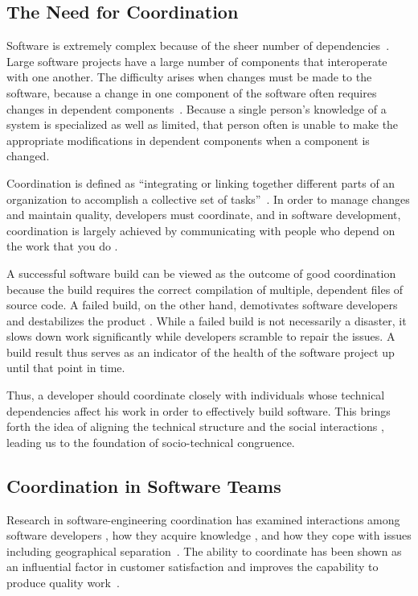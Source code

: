 \subsection{The Need for Coordination}
Software is extremely complex because of the sheer number of dependencies~\cite{sawyer2004:teams}.
Large software projects have a large number of components that interoperate with one another.
The difficulty arises when changes must be made to the software, because a change in one component of the software often requires changes in dependent components~\cite{desouza:2008}. Because a single person's knowledge of a system is specialized as well as limited, that person often is unable to make the appropriate modifications in dependent components when a component is changed.

Coordination is defined as ``integrating or linking together different parts of an organization to accomplish a collective set of tasks''~\cite{vandeven1976}. In order to manage changes and maintain quality, developers must coordinate, and in software development, coordination is largely achieved by communicating with people who depend on the work that you do \cite{kraut:1995coordination}.

A successful software build can be viewed as the outcome of good coordination because the build requires the correct compilation of multiple, dependent files of source code.
A failed build, on the other hand, demotivates software developers \cite{holck2004,damian:icgse:2007} and destabilizes the product \cite{cusumano1997}.
While a failed build is not necessarily a disaster, it slows down work significantly while developers scramble to repair the issues.
A build result thus serves as an indicator of the health of the software project up until that point in time.

Thus, a developer should coordinate closely with individuals whose technical dependencies affect his work in order to effectively build software. This brings forth the idea of aligning the technical structure and the social interactions \cite{herbsleb2007:fose}, leading us to the foundation of socio-technical congruence.

\subsection{Coordination in Software Teams}
Research in software-engineering coordination has examined interactions among
software developers \cite{carter2004,marczak:re:2008}, how they acquire
knowledge \cite{ehrlich:icgse:2006,nakakoji2010:rdc}, and
how they cope with issues including geographical
separation~\cite{espinosa2007:team_knowledge,herbsleb2003:speed}.
The ability to coordinate has
been shown as an influential factor in customer satisfaction \cite{kraut:1995coordination} and  improves the capability to produce quality work~\cite{faraj2000}.


